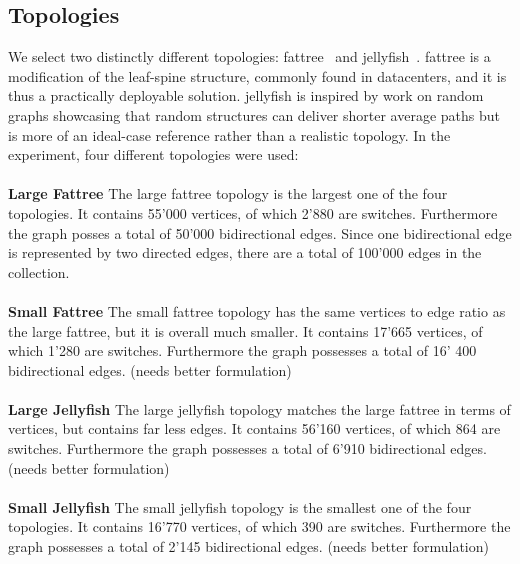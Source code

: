\documentclass[11pt,singlecolumn]{scrartcl}
\begin{document}
\subsection{Topologies}
We select two distinctly different
topologies: fattree~\cite{FatTree} and jellyfish~\cite{Jellyfish}. fattree is a modification of the leaf-spine structure, commonly found in datacenters, and it is thus a practically deployable solution. jellyfish is inspired by work on random graphs showcasing that random structures can deliver shorter average paths but is more of an ideal-case reference rather than a realistic topology.
In the experiment, four different topologies were used:\\\\
\textbf{Large Fattree} \quad  The large fattree topology is the largest one of the four topologies. It contains 55'000 vertices, of which 2'880 are switches. Furthermore the graph posses a total of 50'000 bidirectional edges. Since one bidirectional edge is represented by two directed edges, there are a total of 100'000 edges in the collection.\\\\
\textbf{Small Fattree} \quad The small fattree topology has the same vertices to edge ratio as the large fattree, but it is overall much smaller. It contains 17'665 vertices, of which 1'280 are switches. Furthermore the graph possesses a total of 16' 400 bidirectional edges. (needs better formulation) \\\\
\textbf{Large Jellyfish} \quad  The large jellyfish topology matches the large fattree in terms of vertices, but contains far less edges. It contains 56'160 vertices, of which 864 are switches. Furthermore the graph possesses a total of 6'910 bidirectional edges. (needs better formulation)\\\\
\textbf{Small Jellyfish} \quad The small jellyfish topology is the smallest one of the four topologies. It contains 16'770 vertices, of which 390 are switches. Furthermore the graph possesses a total of 2'145 bidirectional edges. (needs better formulation)
\end{document}
